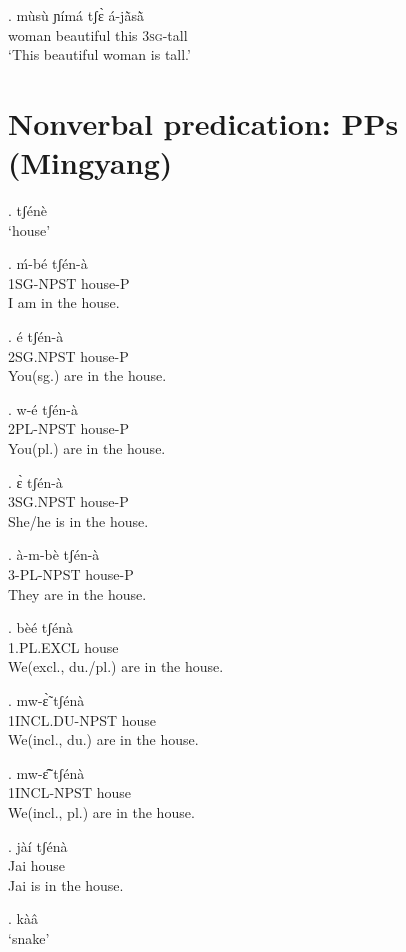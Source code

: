 \documentclass{assets/fieldnotes}
\begin{document}
{\exg. mùsù ɲímá tʃɛ̀ á-jã̀sã̀\\
woman beautiful this \textsc{3sg}-tall\\
`This beautiful woman is tall.'




\section{Nonverbal predication: PPs (Mingyang)} 
\ex. tʃénè\\
    `house'

\exg. ḿ-bé tʃén-à\\
    1SG-NPST house-P\\
    I am in the house.

   
\exg. é tʃén-à\\
    2SG.NPST house-P\\
    You(sg.) are in the house.

\exg. w-é tʃén-à\\
    2PL-NPST house-P\\
    You(pl.) are in the house.

\ex. ɛ̀ tʃén-à\\
    3SG.NPST house-P\\
    She/he is in the house.

\exg. à-m-bè tʃén-à\\
    3-PL-NPST house-P\\
    They are in the house.

\exg. bèé tʃénà\\
    1.PL.EXCL house\\
    We(excl., du./pl.) are in the house.

\exg. mw-ɛ̃̀  tʃénà\\
    1INCL.DU-NPST house\\
    We(incl., du.) are in the house.

\exg. mw-ɛ̃̂  tʃénà\\
    1INCL-NPST house\\
    We(incl., pl.) are in the house.

\ex. jàí tʃénà\\
    Jai house\\
    Jai is in the house.


\ex. kàâ\\
    `snake'

}
\end{document}
